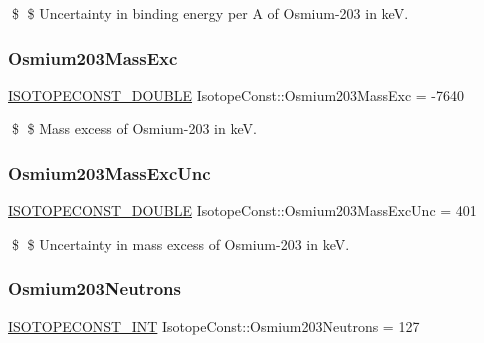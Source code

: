 \$ \$ Uncertainty in binding energy per A of Osmium-\/203 in keV. \mbox{\label{group___isotope_const-_osmium-_os203_gab6285fabdf6f0d4c33cc91e473637404}} 
\subsubsection{\texorpdfstring{Osmium203\+Mass\+Exc}{Osmium203MassExc}}
{\footnotesize\ttfamily \mbox{\hyperlink{group___isotope_const-_macros_ga8f45a7272ce02c0b4c65c44636ed719a}{I\+S\+O\+T\+O\+P\+E\+C\+O\+N\+S\+T\+\_\+\+D\+O\+U\+B\+LE}} Isotope\+Const\+::\+Osmium203\+Mass\+Exc = -\/7640}

\$ \$ Mass excess of Osmium-\/203 in keV. \mbox{\label{group___isotope_const-_osmium-_os203_gacb95df13ed1ad42e6de452a88c6ce543}} 
\subsubsection{\texorpdfstring{Osmium203\+Mass\+Exc\+Unc}{Osmium203MassExcUnc}}
{\footnotesize\ttfamily \mbox{\hyperlink{group___isotope_const-_macros_ga8f45a7272ce02c0b4c65c44636ed719a}{I\+S\+O\+T\+O\+P\+E\+C\+O\+N\+S\+T\+\_\+\+D\+O\+U\+B\+LE}} Isotope\+Const\+::\+Osmium203\+Mass\+Exc\+Unc = 401}

\$ \$ Uncertainty in mass excess of Osmium-\/203 in keV. \mbox{\label{group___isotope_const-_osmium-_os203_gaf874be89c007b94ab48ed2ab6232edcc}} 
\subsubsection{\texorpdfstring{Osmium203\+Neutrons}{Osmium203Neutrons}}
{\footnotesize\ttfamily \mbox{\hyperlink{group___isotope_const-_macros_ga5f18360b3e99483a35c32d789e62621c}{I\+S\+O\+T\+O\+P\+E\+C\+O\+N\+S\+T\+\_\+\+I\+NT}} Isotope\+Const\+::\+Osmium203\+Neutrons = 127}

